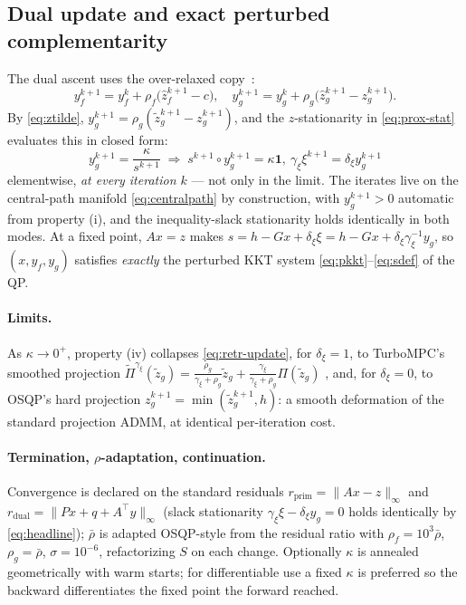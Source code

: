 \documentclass[10pt,twocolumn]{article}
\newcommand{\ones}{\mathbf{1}}
\begin{document}
\subsection{Dual update and exact perturbed complementarity}
The dual ascent uses the over-relaxed copy~\cite{turbompc}:
\begin{equation}
\label{eq:dual}
y_f^{k+1} = y_f^{k} + \rho_f\bigl(\hat z_f^{k+1} - c\bigr),\quad
y_g^{k+1} = y_g^{k} + \rho_g\bigl(\hat z_g^{k+1} - z_g^{k+1}\bigr).
\end{equation}
By \eqref{eq:ztilde}, $y_g^{k+1} = \rho_g(\tilde z_g^{k+1} - z_g^{k+1})$, and the
$z$-stationarity in \eqref{eq:prox-stat} evaluates this in closed form:
\begin{equation}
\label{eq:headline}
\boxed{\,
y_g^{k+1} = \frac{\kappa}{s^{k+1}}
\;\Rightarrow\;
s^{k+1}\!\circ y_g^{k+1} = \kappa\ones,\
\gamma_\xi\xi^{k+1} = \delta_\xi y_g^{k+1}
\,}
\end{equation}
elementwise, \emph{at every iteration $k$} --- not only in the limit. The iterates
live on the central-path manifold \eqref{eq:centralpath} by construction, with
$y_g^{k+1} > 0$ automatic from property (i), and the inequality-slack stationarity
holds identically in both modes. At a fixed point, $Ax = z$ makes
$s = h - Gx + \delta_\xi\xi = h - Gx + \delta_\xi\gamma_\xi^{-1}y_g$, so
$(x, y_f, y_g)$ satisfies \emph{exactly} the perturbed KKT system
\eqref{eq:pkkt}--\eqref{eq:sdef} of the QP.

\paragraph{Limits.} As $\kappa\to 0^+$, property (iv) collapses
\eqref{eq:retr-update}, for $\delta_\xi = 1$, to TurboMPC's smoothed projection
$\tilde\Pi^{\gamma_\xi}(\tilde z_g) =
\frac{\rho_g}{\gamma_\xi+\rho_g}\tilde z_g
+ \frac{\gamma_\xi}{\gamma_\xi+\rho_g}\Pi(\tilde z_g)$
\cite[Eq.~(15)]{turbompc}, and, for $\delta_\xi = 0$, to OSQP's hard projection
$z_g^{k+1} = \min(\tilde z_g^{k+1}, h)$: a smooth deformation of the standard
projection ADMM, at identical per-iteration cost.

\paragraph{Termination, $\rho$-adaptation, continuation.} Convergence is declared on
the standard residuals $r_{\mathrm{prim}} = \|Ax - z\|_\infty$ and
$r_{\mathrm{dual}} = \|Px + q + A^\top y\|_\infty$
\cite[Eq.~(3)]{turbompc} (slack stationarity
$\gamma_\xi\xi - \delta_\xi y_g = 0$ holds identically by \eqref{eq:headline});
$\bar\rho$ is adapted OSQP-style from the residual ratio
with $\rho_f = 10^3\bar\rho$, $\rho_g = \bar\rho$, $\sigma = 10^{-6}$, refactorizing
$S$ on each change. Optionally $\kappa$ is annealed geometrically with warm starts;
for differentiable use a fixed $\kappa$ is preferred so the backward differentiates
the fixed point the forward reached.
\end{document}
